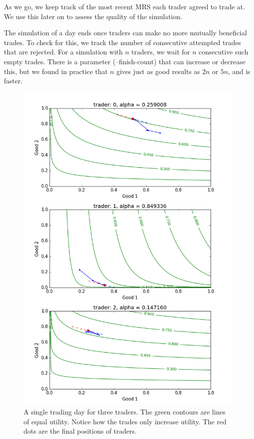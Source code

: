 \documentclass[12pt,a4paper,titlepage]{article}
\begin{document}
As we go, we keep track of the most recent MRS each trader agreed to trade at.
We use this later on to assess the quality of the simulation.

The simulation of a day ends once traders can make no more mutually beneficial trades.
To check for this, we track the number of consecutive attempted trades that are rejected. 
For a simulation with $n$ traders, we wait for $n$ consecutive such empty trades.
There is a parameter (--finish-count) that can increase or decrease this, but we found in practice that $n$ gives just as good results as $2n$ or $5n$, and is faster.

\begin{figure}[H]
    \centering
    \includegraphics[width=\textwidth]{allocations_(seed_13).png}
    \caption{
      A single trading day for three traders.
      The green contours are lines of equal utility.
      Notice how the trades only increase utility.
      The red dots are the final positions of traders.
    }
    \label{fig:day}
\end{figure}
\end{document}

